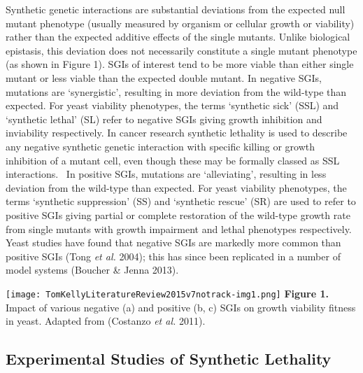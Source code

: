 Synthetic genetic interactions are substantial deviations from the
expected null mutant phenotype (usually measured by organism or
cellular growth or viability) rather than the expected additive effects
of the single mutants. Unlike biological epistasis, this deviation
does not necessarily constitute a single mutant phenotype (as shown in
Figure 1). SGIs of interest tend to be more viable than either single
mutant or less viable than the expected double mutant. In negative
SGIs, mutations are {\textquoteleft}synergistic{\textquoteright},
resulting in more deviation from the wild-type than expected. For
yeast viability phenotypes, the terms {\textquoteleft}synthetic
sick{\textquoteright} (SSL) and {\textquoteleft}synthetic
lethal{\textquoteright} (SL) refer to negative SGIs giving growth
inhibition and inviability respectively. In cancer research synthetic
lethality is used to describe any negative synthetic genetic
interaction with specific killing or growth inhibition of a mutant
cell, even though these may be formally classed as SSL interactions.
\ In positive SGIs, mutations are
{\textquoteleft}alleviating{\textquoteright}, resulting in less
deviation from the wild-type than expected. For yeast viability
phenotypes, the terms {\textquoteleft}synthetic
suppression{\textquoteright} (SS) and {\textquoteleft}synthetic
rescue{\textquoteright} (SR) are used to refer to positive SGIs giving
partial or complete restoration of the wild-type growth rate from
single mutants with growth impairment and lethal phenotypes
respectively. Yeast studies have found that negative SGIs are
markedly more common than positive SGIs (Tong\textit{ et al.} 2004);
this has since been replicated in a number of model systems (Boucher \&
Jenna 2013). 


\texttt{[image: TomKellyLiteratureReview2015v7notrack-img1.png]}
\textbf{Figure 1. }Impact of various negative (a) and positive (b, c)
SGIs on growth viability fitness in yeast. Adapted from
(Costanzo\textit{ et al.} 2011). 


\subsection[Experimental Studies of Synthetic Lethality]{Experimental
Studies of Synthetic Lethality}

